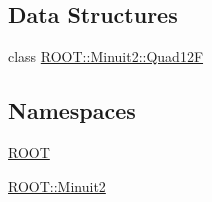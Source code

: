 \subsection*{Data Structures}
\begin{DoxyCompactItemize}
\item 
class \mbox{\hyperlink{classROOT_1_1Minuit2_1_1Quad12F}{R\+O\+O\+T\+::\+Minuit2\+::\+Quad12F}}
\end{DoxyCompactItemize}
\subsection*{Namespaces}
\begin{DoxyCompactItemize}
\item 
 \mbox{\hyperlink{namespaceROOT}{R\+O\+OT}}
\item 
 \mbox{\hyperlink{namespaceROOT_1_1Minuit2}{R\+O\+O\+T\+::\+Minuit2}}
\end{DoxyCompactItemize}
